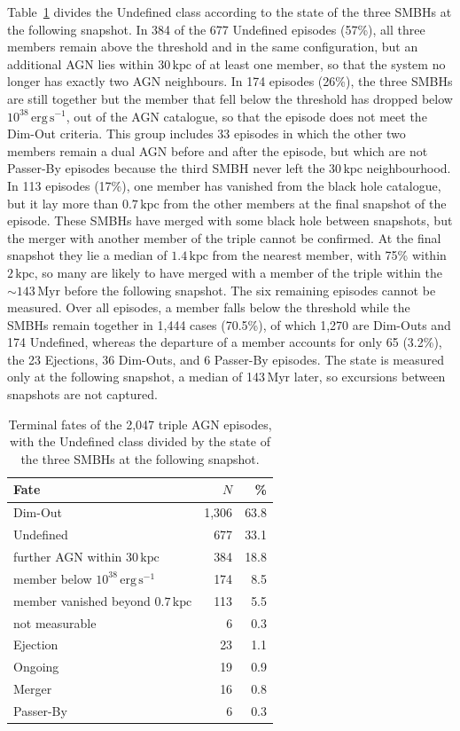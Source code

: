 \documentclass[twocolumn, 10pt]{article}
\begin{document}
Table~\ref{tab:end_states} divides the Undefined class according to the state of the three SMBHs at the following snapshot. In 384 of the 677 Undefined episodes (57\%), all three members remain above the threshold and in the same configuration, but an additional AGN lies within $30\,\mathrm{kpc}$ of at least one member, so that the system no longer has exactly two AGN neighbours. In 174 episodes (26\%), the three SMBHs are still together but the member that fell below the threshold has dropped below $10^{38}\,\mathrm{erg\,s^{-1}}$, out of the AGN catalogue, so that the episode does not meet the Dim-Out criteria. This group includes 33 episodes in which the other two members remain a dual AGN before and after the episode, but which are not Passer-By episodes because the third SMBH never left the $30\,\mathrm{kpc}$ neighbourhood. In 113 episodes (17\%), one member has vanished from the black hole catalogue, but it lay more than $0.7\,\mathrm{kpc}$ from the other members at the final snapshot of the episode. These SMBHs have merged with some black hole between snapshots, but the merger with another member of the triple cannot be confirmed. At the final snapshot they lie a median of $1.4\,\mathrm{kpc}$ from the nearest member, with 75\% within $2\,\mathrm{kpc}$, so many are likely to have merged with a member of the triple within the $\sim 143\,\mathrm{Myr}$ before the following snapshot. The six remaining episodes cannot be measured. Over all episodes, a member falls below the threshold while the SMBHs remain together in 1,444 cases (70.5\%), of which 1,270 are Dim-Outs and 174 Undefined, whereas the departure of a member accounts for only 65 (3.2\%), the 23 Ejections, 36 Dim-Outs, and 6 Passer-By episodes. The state is measured only at the following snapshot, a median of 143\,Myr later, so excursions between snapshots are not captured.

\begin{table}
    \centering
    \caption{Terminal fates of the 2,047 triple AGN episodes, with the Undefined class divided by the state of the three SMBHs at the following snapshot.}
    \label{tab:end_states}
    \begin{tabular}{lrr}
        \hline
        Fate & $N$ & \% \\
        \hline
        Dim-Out & 1,306 & 63.8 \\
        Undefined & 677 & 33.1 \\
        \quad further AGN within $30\,\mathrm{kpc}$ & 384 & 18.8 \\
        \quad member below $10^{38}\,\mathrm{erg\,s^{-1}}$ & 174 & 8.5 \\
        \quad member vanished beyond $0.7\,\mathrm{kpc}$ & 113 & 5.5 \\
        \quad not measurable & 6 & 0.3 \\
        Ejection & 23 & 1.1 \\
        Ongoing & 19 & 0.9 \\
        Merger & 16 & 0.8 \\
        Passer-By & 6 & 0.3 \\
        \hline
    \end{tabular}
\end{table}
\end{document}
